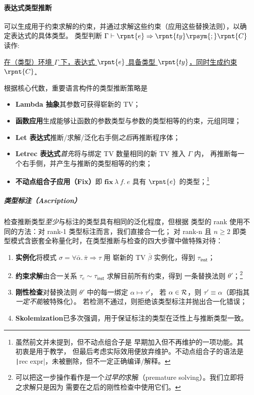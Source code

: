 \paragraph{表达式类型推断} 可以生成用于约束求解的约束，并通过求解这些约束（应用这些替换法则），以确定表达式的具体类型。
类型判断 \(\Gamma  \vdash  \rpnt{e}  \Rightarrow  \rpnt{ty}  \rpsym{;}  \rpnt{C}\) 读作:
\begin{center}
  \vspace{-.8em}
  \underline{
    在（类型）环境 $\Gamma$ 下，表达式 \(\rpnt{e}\) 具备类型 \(\rpnt{ty}\)，同时生成约束 \(\rpnt{C}\).
  }
\end{center}
根据核心代数，重要语言构件的类型推断策略是
\vspace{-1em}
\begin{itemize}\itemsep-.5em
  \item \textbf{Lambda 抽象}\quad 其参数可获得崭新的 TV；
  \item\textbf{函数应用}\quad 生成能够让函数的参数类型与参数的类型相等的约束，元组同理；
  \item\textbf{Let 表达式}\quad 推断/求解/泛化右手侧\emph{之后}再推断程序体；
  \item\textbf{Letrec 表达式}\quad\emph{首先}将与绑定 TV 数量相同的新 TV 推入 $\Gamma$ 内，
    再推断每一个右手侧，并产生与推断的类型相等的约束；
  \item\textbf{不动点组合子应用（Fix）}\quad 即 \(\mathbf{fix}\ \lambda\ f.\ e\) 具有 \(\rpnt{e}\) 的类型；\footnote{
      虽然前文并未提到，但不动点组合子是 \Tigris 早期加入但不再维护的一项功能。其初衷是用于教学，
      但最后考虑实际效用便放弃维护。不动点组合子的语法是 \texttt|rec expr|，未被删除，但不一定正确编译/解释。
    }
\end{itemize}
\vspace{-1.4em}
\subparagraph*{类型标注（Ascription）} 检查推断类型\emph{至少}与标注的类型具有相同的泛化程度，但根据
类型的 rank 使用不同的方法：对 rank-1 类型标注而言，我们直接合一化；
对 rank-n 且 $n\ge 2$ 即类型模式含嵌套全称量化时，在类型推断与检查的四大步骤中做特殊对待：
\enlargethispage{\baselineskip}
\vspace{-.8em}
\begin{enumerate}\itemsep-.8em
  \item \textbf{实例化}\quad 将模式 \(\sigma = \forall \bar{\alpha}.\, \bar{\pi} \Rightarrow \tau\) 用
    崭新的 TV \(\bar{\beta}\) 实例化，得到 \(\tau_{\mathsf{inst}}\)；
  \item \textbf{约束求解}\quad 由合一关系 $\tau_e \sim \tau_{\mathsf{inst}}$ 求解目前所有约束，得到
    一条替换法则 $\theta'$；\footnote{
      可以把这一步操作看作是一个\emph{过早的}求解（premature solving）。我们立即将之求解只是因为
      需要在之后的刚性检查中使用它们。
    }
  \item \textbf{刚性检查}\quad 对替换法则 $\theta'$ 中的每一绑定 $\alpha \mapsto \tau'$，
    若 $\alpha \in \mathcal{R}$，则 $\tau'\equiv\alpha$（即指其\emph{一定不能}被特殊化）。
    若检测不通过，则拒绝该类型标注并抛出合一化错误；
  \item \textbf{Skolemization}\quad 已多次强调，用于保证标注的类型在泛性上与推断类型一致。
\end{enumerate}

